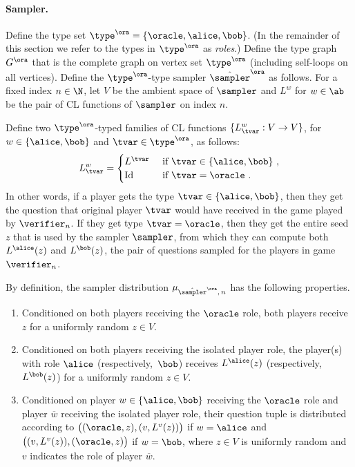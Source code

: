 \paragraph{Sampler.}
Define the type set $\type^\ora = \{\oracle,\alice,\bob\}$.
(In the remainder of this section we refer to the types in $\type^\ora$ as
\emph{roles}.)
Define the type graph $G^\ora$ that is the complete graph on vertex set
$\type^\ora$ (including self-loops on all vertices).
Define the $\type^\ora$-type sampler $\tsora$ as follows.
For a fixed index $n \in \N$, let $V$ be the ambient space of $\sampler$ and
$L^w$ for $w \in \ab $ be the pair of CL functions of $\sampler$ on index $n$.

Define two $\type^\ora$-typed families of CL functions $\{ L^{w}_\tvar: V \to V
\}$, for $w \in \{\alice,\bob\}$ and $\tvar \in \type^\ora$, as follows:
\begin{equation*}
	L^{w}_\tvar =
  \begin{cases}
		L^\tvar & \text { if $\tvar \in \{\alice,\bob\}$ }, \\
		\mathrm{Id} & \text { if $\tvar = \oracle$ }.
	\end{cases}
\end{equation*}
In other words, if a player gets the type $\tvar \in \{\alice,\bob\}$, then they
get the question that original player $\tvar$ would have received in the game
played by $\verifier_n$.
If they get type $\tvar = \oracle$, then they get the entire seed $z$ that is
used by the sampler $\sampler$, from which they can compute both $L^\alice(z)$
and $L^\bob(z)$, the pair of questions sampled for the players in game
$\verifier_n$.


By definition, the sampler distribution $\mu_{\tsora,\, n}$ has the
following properties.
\begin{enumerate}
\item Conditioned on both players receiving the $\oracle$ role, both players
  receive $z$ for a uniformly random $z \in V$.
		
\item Conditioned on both players receiving the isolated player role, the
  player(s) with role $\alice$ (respectively,~$\bob$) receives $L^\alice(z)$
  (respectively, $L^\bob(z)$) for a uniformly random $z \in V$.
		
\item Conditioned on player $w\in\{\alice,\bob\}$ receiving the $\oracle$ role
  and player $\overline{w}$ receiving the isolated player role, their question
  tuple is distributed according to $\bigl( (\oracle,z), (v,L^v(z)) \bigr)$ if
  $w=\alice$ and $\bigl( (v, L^v(z)), (\oracle,z) \bigr)$ if $w=\bob$, where $z
  \in V$ is uniformly random and $v$ indicates the role of player
  $\overline{w}$.
\end{enumerate}

